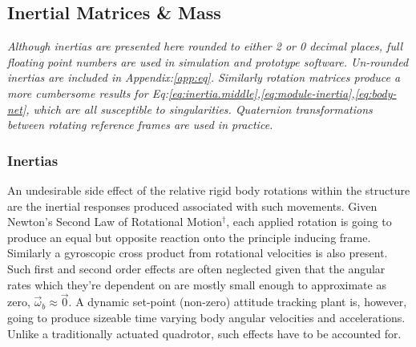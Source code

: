 \subsection{Inertial Matrices \& Mass}
\label{subsec:proto.design.inertia}
\emph{\color{Gray} Although inertias are presented here rounded to either 2 or 0 decimal places, full floating point numbers are used in simulation and prototype software. Un-rounded inertias are included in Appendix:\ref{app:eq}. Similarly rotation matrices produce a more cumbersome results for Eq:\ref{eq:inertia.middle},\ref{eq:module-inertia},\ref{eq:body-net}, which are all  susceptible to singularities. Quaternion transformations between rotating reference frames are used in practice.}
\subsubsection*{Inertias}
An undesirable side effect of the relative rigid body rotations within the structure are the inertial responses produced associated with such movements. Given Newton's Second Law of Rotational Motion$^{\dagger}$, each applied rotation is going to produce an equal but opposite reaction onto the principle inducing frame. Similarly a gyroscopic cross product from rotational velocities is also present. Such first and second order effects are often neglected given that the angular rates which they're dependent on are mostly small enough to approximate as zero, $\vec{\omega}_b\approx\vec{0}$. A dynamic set-point (non-zero) attitude tracking plant is, however, going to produce sizeable time varying body angular velocities and accelerations. Unlike a traditionally actuated quadrotor, such effects have to be accounted for.
